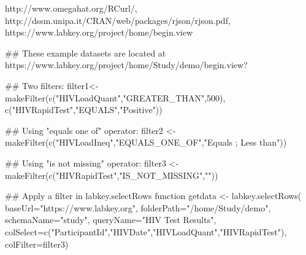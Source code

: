 \documentclass{book}
\begin{document}
\begin{References}\relax
http://www.omegahat.org/RCurl/, \\
http://dssm.unipa.it/CRAN/web/packages/rjson/rjson.pdf,\\
https://www.labkey.org/project/home/begin.view
\end{References}
\begin{SeeAlso}\relax
{}
\end{SeeAlso}
\begin{Examples}
\begin{ExampleCode}
## These example datasets are located at https://www.labkey.org/project/home/Study/demo/begin.view?

## Two filters:
filter1<- makeFilter(c("HIVLoadQuant","GREATER_THAN",500), c("HIVRapidTest","EQUALS","Positive"))

## Using "equals one of" operator:
filter2 <- makeFilter(c("HIVLoadIneq","EQUALS_ONE_OF","Equals ; Less than"))

## Using "is not missing" operator:
filter3 <- makeFilter(c("HIVRapidTest","IS_NOT_MISSING","")) 

## Apply a filter in labkey.selectRows function
getdata <- labkey.selectRows(
baseUrl="https://www.labkey.org", 
folderPath="/home/Study/demo", 
schemaName="study", 
queryName="HIV Test Results", 
colSelect=c("ParticipantId","HIVDate","HIVLoadQuant","HIVRapidTest"), 
colFilter=filter3)


\end{ExampleCode}
\end{Examples}
\end{document}
